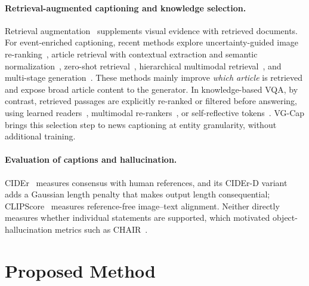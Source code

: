 \documentclass[runningheads]{llncs}
\DeclareRobustCommand{\revise}[1]{{\color{olive}#1}}
\DeclareRobustCommand{\revise}[1]{#1}
\begin{document}
\paragraph{\textbf{Retrieval-augmented captioning and knowledge selection.}}
Retrieval augmentation~\cite{lewis2020rag,ramos2023smallcap} supplements visual evidence with retrieved documents. For event-enriched captioning, recent methods explore uncertainty-guided image re-ranking~\cite{enric}, article retrieval with contextual extraction and semantic normalization~\cite{recap}, zero-shot retrieval~\cite{dinh2025zsecap}, hierarchical multimodal retrieval~\cite{nguyen2026hierarchical}, and multi-stage generation~\cite{hien2026cian}. These methods mainly improve \emph{which article} is retrieved and expose broad article content to the generator. \revise{In knowledge-based VQA, by contrast, retrieved passages are explicitly re-ranked or filtered before answering, using learned readers~\cite{gui2022kat}, multimodal re-rankers~\cite{yan2024echosight}, or self-reflective tokens~\cite{cocchi2025reflectiva}. VG-Cap brings this selection step to news captioning at entity granularity, without additional training.}

\paragraph{\textbf{Evaluation of captions and hallucination.}}
CIDEr~\cite{vedantam2015cider} measures consensus with human references, and its CIDEr-D variant adds a Gaussian length penalty that makes output length consequential; CLIPScore~\cite{hessel2021clipscore} measures reference-free image--text alignment. \revise{Neither directly measures whether individual statements are supported, which motivated object-hallucination metrics such as CHAIR~\cite{rohrbach2018object}.}

\section{Proposed Method}
\label{sec:method}
\end{document}
